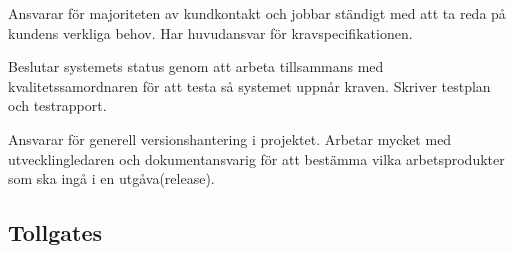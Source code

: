 Ansvarar för majoriteten av kundkontakt och jobbar ständigt med att ta reda på kundens verkliga behov. Har huvudansvar för kravspecifikationen.

Beslutar systemets status genom att arbeta tillsammans med kvalitetssamordnaren för att testa så systemet uppnår kraven. Skriver testplan och testrapport.

Ansvarar för generell versionshantering i projektet. Arbetar mycket med utvecklingledaren och dokumentansvarig för att bestämma vilka arbetsprodukter som ska ingå i en utgåva(release).




\subsection{Tollgates}
